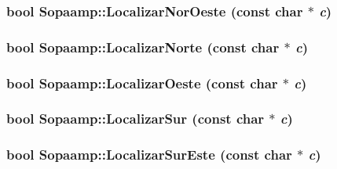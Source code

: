 \hypertarget{class_sopaamp_a2e75da42ebca6ac51f1ec389f50c2f9}{
\subsubsection[{LocalizarNorOeste}]{\setlength{\rightskip}{0pt plus 5cm}bool Sopaamp::LocalizarNorOeste (const char $\ast$ {\em c})}}
\label{class_sopaamp_a2e75da42ebca6ac51f1ec389f50c2f9}


\hypertarget{class_sopaamp_6e80e56b5638e75e2044d0079c7c5339}{
\subsubsection[{LocalizarNorte}]{\setlength{\rightskip}{0pt plus 5cm}bool Sopaamp::LocalizarNorte (const char $\ast$ {\em c})}}
\label{class_sopaamp_6e80e56b5638e75e2044d0079c7c5339}


\hypertarget{class_sopaamp_608e1da98962ce16b3b03bcbb91f9911}{
\subsubsection[{LocalizarOeste}]{\setlength{\rightskip}{0pt plus 5cm}bool Sopaamp::LocalizarOeste (const char $\ast$ {\em c})}}
\label{class_sopaamp_608e1da98962ce16b3b03bcbb91f9911}


\hypertarget{class_sopaamp_4a034d15e58854d457345a9dd8789928}{
\subsubsection[{LocalizarSur}]{\setlength{\rightskip}{0pt plus 5cm}bool Sopaamp::LocalizarSur (const char $\ast$ {\em c})}}
\label{class_sopaamp_4a034d15e58854d457345a9dd8789928}


\hypertarget{class_sopaamp_0e9b2cca73363ae98088c522810cb52a}{
\subsubsection[{LocalizarSurEste}]{\setlength{\rightskip}{0pt plus 5cm}bool Sopaamp::LocalizarSurEste (const char $\ast$ {\em c})}}
\label{class_sopaamp_0e9b2cca73363ae98088c522810cb52a}


